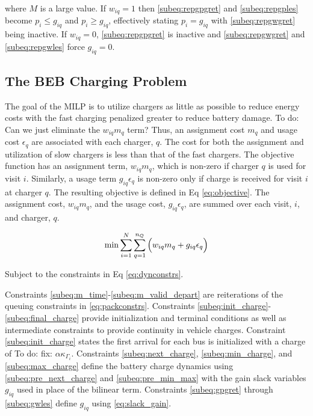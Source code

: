 \documentclass[utf8]{FrontiersinHarvard}
\newcommand{\TODO}[1]{{\color{green} To do: #1}}                                %
\begin{document}
\noindent
where $M$ is a large value. If $w_{iq} = 1$ then \eqref{subeq:repgpgret} and \eqref{subeq:repgples} become $p_i \leq
g_{iq}$ and $p_i \geq g_{iq}$, effectively stating $p_i = g_{iq}$ with \eqref{subeq:repgwgret} being inactive. If $w_{iq} =
0$, \eqref{subeq:repgpgret} is inactive and \eqref{subeq:repgwgret} and \eqref{subeq:repgwles} force $g_{iq} = 0$.

\subsection{The BEB Charging Problem} \label{sec:BEB_MILP}
The goal of the MILP is to utilize chargers as little as possible to reduce energy costs with the fast charging
penalized greater to reduce battery damage. \TODO{Can we just eliminate the $w_{iq} m_q$ term? } Thus, an assignment
cost $m_q$ and usage cost $\epsilon_q$ are associated with each charger, $q$. The cost for both the assignment and utilization
of slow chargers is less than that of the fast chargers. The objective function has an assignment term, $w_{iq}m_q$,
which is non-zero if charger $q$ is used for visit $i$. Similarly, a usage term $g_{iq} \epsilon_q$ is non-zero only if
charge is received for visit $i$ at charger $q$. The resulting objective is defined in Eq \ref{eq:objective}. The
assignment cost, $w_{iq}m_q$, and the usage cost, $g_{iq}\epsilon_q$, are summed over each visit, $i$, and charger, $q$.

\begin{equation}
\label{eq:objective}
	\min \sum_{i=1}^N \sum_{q=1}^{n_Q} \Big( w_{iq} m_q + g_{iq} \epsilon_q \Big) \\
\end{equation}

Subject to the constraints in Eq \ref{eq:dynconstrs}.



Constraints \eqref{subeq:m_time}-\eqref{subeq:m_valid_depart} are reiterations of the queuing constraints in
\eqref{eq:packconstrs}. Constraints \eqref{subeq:init_charge}-\eqref{subeq:final_charge} provide initialization and
terminal conditions as well as intermediate constraints to provide continuity in vehicle charges. Constraint
\eqref{subeq:init_charge} states the first arrival for each bus is initialized with a charge of \TODO{fix:} $\alpha \kappa_{\Gamma_i}$.
Constraints \eqref{subeq:next_charge}, \eqref{subeq:min_charge}, and \eqref{subeq:max_charge} define the battery charge
dynamics using \eqref{subeq:pre_next_charge} and \eqref{subeq:pre_min_max} with the gain slack variables $g_{iq}$ used
in place of the bilinear term. Constraints \eqref{subeq:gpgret} through \eqref{subeq:gwles} define $g_{iq}$ using
\eqref{eq:slack_gain}.
\end{document}

